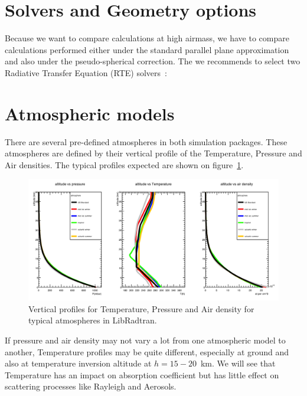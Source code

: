 \documentclass[a4paper]{article}
\begin{document}
\section{Solvers and Geometry options}

Because we want to compare calculations at high airmass, we have to compare calculations performed either under the standard parallel plane approximation and also under the pseudo-spherical correction.
The we recommends to select two Radiative Transfer Equation (RTE) solvers~:


\section{Atmospheric models}

There are several pre-defined atmospheres in both simulation packages. These atmospheres are defined by their
vertical profile of the Temperature, Pressure and Air densities. The typical profiles expected are shown on figure~\ref{fig:rt_atmprof}.

\begin{figure}
\centering
\includegraphics[width=1\textwidth]{images/rt_atmprof.png}
\caption{\label{fig:rt_atmprof}Vertical profiles for Temperature, Pressure and Air density for typical atmospheres in LibRadtran.}
\end{figure}
If pressure and air density may not vary a lot from one atmospheric model to another, Temperature profiles may be quite different, especially at ground and also at temperature inversion altitude at $h=15-20$~km.
We will see that Temperature has an impact on absorption coefficient but has little effect on scattering processes like Rayleigh and Aerosols.
\end{document}
